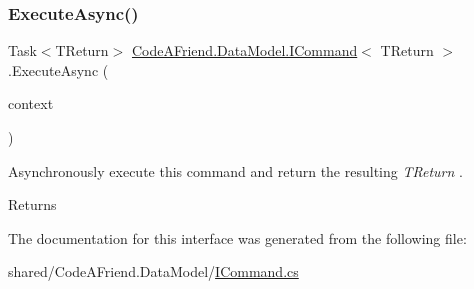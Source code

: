 \subsubsection{\texorpdfstring{Execute\+Async()}{ExecuteAsync()}}
{\footnotesize\ttfamily Task$<$T\+Return$>$ \mbox{\hyperlink{interface_code_a_friend_1_1_data_model_1_1_i_command}{Code\+A\+Friend.\+Data\+Model.\+I\+Command}}$<$ T\+Return $>$.Execute\+Async (\begin{DoxyParamCaption}\item[{Db\+Context}]{context }\end{DoxyParamCaption})}



Asynchronously execute this command and return the resulting {\itshape T\+Return} . 

\begin{DoxyReturn}{Returns}

\end{DoxyReturn}


The documentation for this interface was generated from the following file\+:\begin{DoxyCompactItemize}
\item 
shared/\+Code\+A\+Friend.\+Data\+Model/\mbox{\hyperlink{_i_command_8cs}{I\+Command.\+cs}}\end{DoxyCompactItemize}
